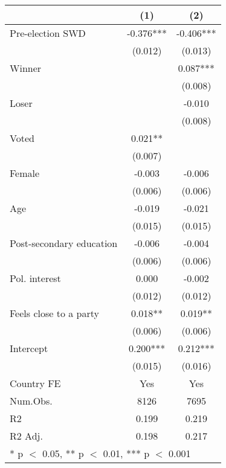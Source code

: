 \begin{table}
\centering
\begin{tabular}[t]{lcc}
\toprule
  & (1) & (2)\\
\midrule
Pre-election SWD & -0.376*** & -0.406***\\
 & (0.012) & (0.013)\\
Winner &  & 0.087***\\
 &  & \vphantom{1} (0.008)\\
Loser &  & -0.010\\
 &  & (0.008)\\
Voted & 0.021** & \\
 & (0.007) & \\
Female & -0.003 & -0.006\\
 & (0.006) & \vphantom{2} (0.006)\\
Age & -0.019 & -0.021\\
 & (0.015) & (0.015)\\
Post-secondary education & -0.006 & -0.004\\
 & (0.006) & \vphantom{1} (0.006)\\
Pol. interest & 0.000 & -0.002\\
 & (0.012) & (0.012)\\
Feels close to a party & 0.018** & 0.019**\\
 & (0.006) & (0.006)\\
Intercept & 0.200*** & 0.212***\\
 & (0.015) & (0.016)\\
\midrule
Country FE & Yes & Yes\\
Num.Obs. & 8126 & 7695\\
R2 & 0.199 & 0.219\\
R2 Adj. & 0.198 & 0.217\\
\bottomrule
\multicolumn{3}{l}{\rule{0pt}{1em}* p $<$ 0.05, ** p $<$ 0.01, *** p $<$ 0.001}\\
\end{tabular}
\end{table}
